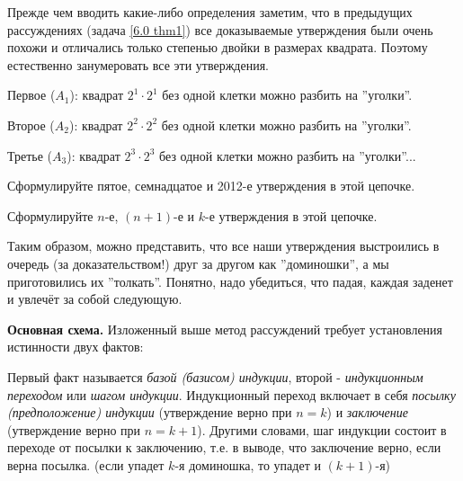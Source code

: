 Прежде чем вводить какие-либо определения заметим, что в предыдущих рассуждениях (задача \ref{6.0 thm1}) все доказываемые утверждения были очень похожи и отличались только степенью двойки в размерах квадрата. Поэтому естественно занумеровать все эти утверждения. 
\par
Первое ($A_1$): квадрат $2^1 \cdot 2^1$ без одной клетки можно разбить на ''уголки''. 
\par
Второе ($A_2$): квадрат $2^2 \cdot 2^2$ без одной клетки можно разбить на ''уголки''. 
\par
Третье ($A_3$): квадрат $2^3 \cdot 2^3$ без одной клетки можно разбить на ''уголки''...

\begin{ex}
Сформулируйте пятое, семнадцатое и 2012-е утверждения в этой цепочке.
\end{ex}

\begin{ex}
Сформулируйте $n$-е, $(n+1)$-е и $k$-е утверждения в этой цепочке.
\end{ex}

Таким образом, можно представить, что все наши утверждения выстроились в очередь (за доказательством!) друг за другом как ''доминошки'', а мы приготовились их ''толкать''. Понятно, надо убедиться, что падая, каждая заденет и увлечёт за собой следующую.

\newpage

\textbf{Основная схема.} Изложенный выше метод рассуждений требует установления истинности двух фактов:


Первый факт называется \textit{базой (базисом) индукции}, второй - \textit{индукционным переходом} или \textit{шагом индукции}. Индукционный переход включает в себя \textit{посылку (предположение) индукции} (утверждение верно при $n = k$) и \textit{заключение} (утверждение верно при $n = k + 1$). Другими словами, шаг индукции состоит в переходе от посылки к заключению, т.е. в выводе, что заключение верно, если верна посылка. (если упадет $k$-я
доминошка, то упадет и $(k+1)$-я) 

